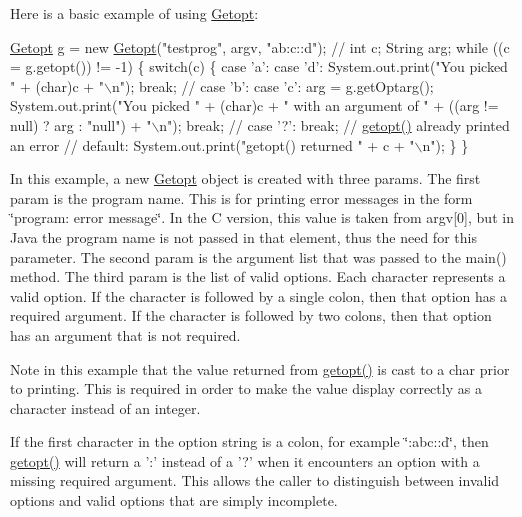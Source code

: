 Here is a basic example of using \hyperlink{classgnu_1_1getopt_1_1_getopt}{Getopt}: 


\begin{DoxyPre}
 \hyperlink{classgnu_1_1getopt_1_1_getopt}{Getopt} g = new \hyperlink{classgnu_1_1getopt_1_1_getopt}{Getopt}("testprog", argv, "ab:c::d");
 //
 int c;
 String arg;
 while ((c = g.getopt()) != -1)
   \{
     switch(c)
       \{
          case 'a':
          case 'd':
            System.out.print("You picked " + (char)c + "\(\backslash\)n");
            break;
            //
          case 'b':
          case 'c':
            arg = g.getOptarg();
            System.out.print("You picked " + (char)c + 
                             " with an argument of " +
                             ((arg != null) ? arg : "null") + "\(\backslash\)n");
            break;
            //
          case '?':
            break; // \hyperlink{classgnu_1_1getopt_1_1_getopt_a49e6fc6e18756f5dfaf85c1067325c3b}{getopt()} already printed an error
            //
          default:
            System.out.print("getopt() returned " + c + "\(\backslash\)n");
       \}
   \}
 \end{DoxyPre}
 

In this example, a new \hyperlink{classgnu_1_1getopt_1_1_getopt}{Getopt} object is created with three params. The first param is the program name. This is for printing error messages in the form \char`\"{}program: error message\char`\"{}. In the C version, this value is taken from argv\mbox{[}0\mbox{]}, but in Java the program name is not passed in that element, thus the need for this parameter. The second param is the argument list that was passed to the main() method. The third param is the list of valid options. Each character represents a valid option. If the character is followed by a single colon, then that option has a required argument. If the character is followed by two colons, then that option has an argument that is not required. 

Note in this example that the value returned from \hyperlink{classgnu_1_1getopt_1_1_getopt_a49e6fc6e18756f5dfaf85c1067325c3b}{getopt()} is cast to a char prior to printing. This is required in order to make the value display correctly as a character instead of an integer. 

If the first character in the option string is a colon, for example \char`\"{}:abc::d\char`\"{}, then \hyperlink{classgnu_1_1getopt_1_1_getopt_a49e6fc6e18756f5dfaf85c1067325c3b}{getopt()} will return a ':' instead of a '?' when it encounters an option with a missing required argument. This allows the caller to distinguish between invalid options and valid options that are simply incomplete. 


